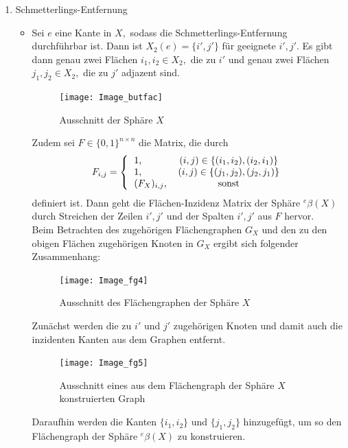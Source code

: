 \documentclass[12pt,titlepage,twoside,cleardoublepage]{article}
\theoremstyle{nummermitklammern}
\numberwithin{equation}{section}
\begin{document}
\begin{enumerate}
\item Schmetterlings-Entfernung
\begin{itemize}
\item Sei $e$ eine Kante in $X,$ sodass die Schmetterlings-Entfernung durchführbar ist. Dann ist $X_2(e)=\{i',j'\}$ für geeignete $i',j'.$ Es gibt dann genau zwei Flächen $i_1,i_2\in X_2,$ die zu $i'$ und genau zwei Flächen $j_1,j_2\in X_2,$ die zu $j'$ adjazent sind. 
\begin{figure}[H]
\begin{center}
\texttt{[image: Image\_butfac]}
\end{center}
\caption{Ausschnitt der Sphäre $X$}
\end{figure}
Zudem sei $F\in \{0,1\}^{n\times n}$ die Matrix, die durch
 \[
F_{i,j}=
\Biggl{\{\begin{tabular}[l]{lcr}
1,&\textcolor{black}{$(i,j)\in \{(i_1,i_2),(i_2,i_1)\}$} \\
1,&\textcolor{black}{$(i,j)\in \{(j_1,j_2),(j_2,j_1)\}$} \\
$(F_{X})_{i,j}$,& sonst\\
\end{tabular}}
\] definiert ist. Dann geht die Flächen-Inzidenz Matrix der Sphäre ${}^e\beta(X)$ durch Streichen der Zeilen $i',j'$ und der Spalten $i',j'$ aus $F$ hervor.\\
Beim Betrachten des zugehörigen Flächengraphen $G_X$ und den zu den obigen Flächen zugehörigen Knoten in $G_X$ ergibt sich folgender Zusammenhang:
\begin{figure}[H]
\begin{center}
\texttt{[image: Image\_fg4]}
\end{center}
\caption{Ausschnitt des Flächengraphen der Sphäre $X$}
\end{figure}
Zunächst werden die zu $i'$ und $j'$ zugehörigen Knoten und damit auch die inzidenten Kanten aus dem Graphen entfernt. 
\begin{figure}[H]
\begin{center}
\texttt{[image: Image\_fg5]}
\end{center}
\caption{Ausschnitt eines aus dem Flächengraph der Sphäre $X$ konstruierten Graph}
\end{figure}
Daraufhin werden die Kanten $\{i_1,i_2\}$ und $\{j_1,j_2\}$ hinzugefügt, um so den Flächengraph der Sphäre ${}^e\beta(X)$ zu konstruieren. 
\begin{figure}[H]
\begin{center}

\end{center}
\end{figure}
\end{itemize}
\end{enumerate}
\end{document}
